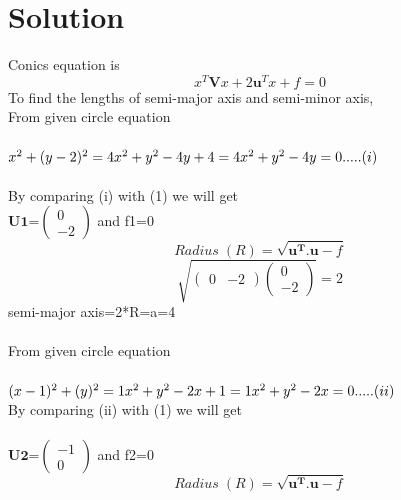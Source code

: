 \documentclass[10pt, a4paper]{article}
\newcommand{\myvec}[1]{\ensuremath{\begin{pmatrix}#1\end{pmatrix}}}
\let\vec\mathbf
\begin{document}
\section{Solution}
Conics equation is 
\begin{equation}
	x^T\vec{V}x + 2\vec{u}^Tx + f = 0
\end{equation}
To find the lengths of semi-major axis and semi-minor axis,\\
From given circle equation \\\\ 
\begin{math}
x^2 + (y-2)^2=4\\\\
x^2+y^2-4y+4=4 \\\\
x^2+y^2-4y=0.....(i)
\end{math}\\\\
By comparing (i) with (1) we will get\\
$\vec{U1}$=$\myvec{0\\-2}$ and f1=0
\begin{equation}
	Radius\;(R) =\sqrt{\vec{u^T}.\vec{u}-f}
\end{equation}
\begin{equation}                                                                                   \sqrt{\myvec{0 &-2}\myvec{0\\-2}} =2                                     
\end{equation}
semi-major axis=2*R=a=4\\\\
From given circle equation \\\\
\begin{math}
(x-1)^2 + (y)^2=1\\\\
x^2+y^2-2x+1=1 \\\\
x^2+y^2-2x=0.....(ii)\\\\
\end{math}\\
By comparing (ii) with (1) we will get\\\\
$\vec{U2}$=$\myvec{-1\\0}$ and f2=0
\begin{equation}
	Radius\;(R) =\sqrt{\vec{u^T}.\vec{u}-f}
\end{equation}
\end{document}
